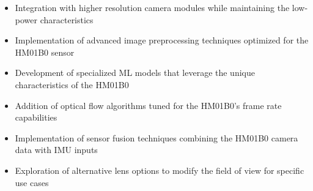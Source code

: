 \begin{itemize}
    
    
    
    \item Integration with higher resolution camera modules while maintaining the low-power characteristics
    
    
    
    \item Implementation of advanced image preprocessing techniques optimized for the HM01B0 sensor
    
    
    
    \item Development of specialized ML models that leverage the unique characteristics of the HM01B0
    
    
    
    \item Addition of optical flow algorithms tuned for the HM01B0's frame rate capabilities
    
    
    
    \item Implementation of sensor fusion techniques combining the HM01B0 camera data with IMU inputs
    
    
    
    \item Exploration of alternative lens options to modify the field of view for specific use cases
    
    
    
\end{itemize}